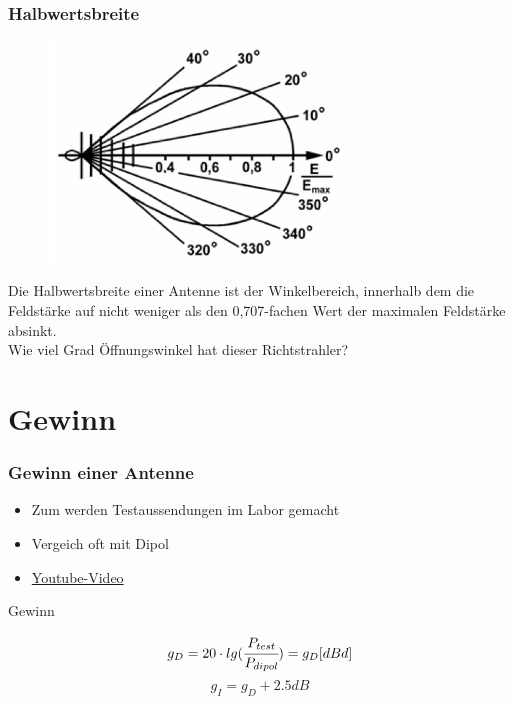 \begin{frame}
  \frametitle{Halbwertsbreite}
  \begin{center}
    \begin{figure}
      \includegraphics[width=0.7\textwidth,height=.75\textheight,keepaspectratio]{a09/TH213.png}
    \end{figure}
    \large Die Halbwertsbreite einer Antenne ist der Winkelbereich, innerhalb dem
    die Feldstärke auf nicht weniger als den 0,707-fachen Wert der maximalen Feldstärke absinkt.\\[1em] Wie viel Grad Öffnungswinkel hat dieser Richtstrahler?
  \end{center}
\end{frame}

\section*{Gewinn}

\begin{frame}
  \frametitle{Gewinn einer Antenne}
  \begin{itemize}
    \item Zum werden Testaussendungen im Labor gemacht
    \item Vergeich oft mit Dipol
    \item \href{https://www.youtube.com/watch?v=gBqqp7rnZ64}{\ExternalLink Youtube-Video}\\[2em]
  \end{itemize}
  \begin{block}{Gewinn}
    \begin{center}
      $$g_D = 20 \cdot lg(\cfrac{P_{test}}{P_{dipol}}) = g_D[dBd]$$
      $$g_I = g_D + 2.5dB$$
    \end{center}
  \end{block}
\end{frame}

